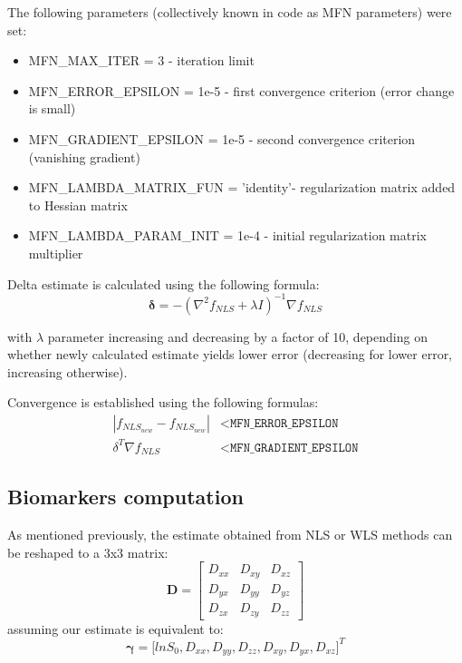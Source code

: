 The following parameters (collectively known in code as MFN parameters) were set:
\begin{itemize}
	\item 
	MFN\_MAX\_ITER = 3 - iteration limit
	
	\item
	MFN\_ERROR\_EPSILON = 1e-5 - first convergence criterion (error change is small)
	
	\item
	MFN\_GRADIENT\_EPSILON = 1e-5 - second convergence criterion (vanishing gradient)
	
	\item
	MFN\_LAMBDA\_MATRIX\_FUN = 'identity'- regularization matrix added to Hessian matrix
	
	\item 
	MFN\_LAMBDA\_PARAM\_INIT = 1e-4 - initial regularization matrix multiplier
\end{itemize}

Delta estimate is calculated using the following formula:
\begin{equation}
\boldsymbol{\delta}=-\left(\nabla^2{f_{NLS}+\lambda I}\right)^{-1}\nabla{f_{NLS}}
\label{Eq:m6_impl_3}
\end{equation}

with $\lambda$ parameter increasing and decreasing by a factor of 10, depending on whether newly calculated estimate yields lower error (decreasing for lower error, increasing otherwise).

Convergence is established using the following formulas:
\begin{equation}
\begin{aligned}
\left|f_{NLS_{new}} - f_{NLS_{new}}\right| &< \texttt{MFN\_ERROR\_EPSILON} \\
\delta^T\nabla{f_{NLS}} &< \texttt{MFN\_GRADIENT\_EPSILON}
\end{aligned}
\end{equation}

\subsection{Biomarkers computation}

As mentioned previously, the estimate obtained from NLS or WLS methods can be reshaped to a 3x3 matrix:
\begin{equation}
\boldsymbol{D}=
\begin{bmatrix}
D_{xx} & D_{xy} & D_{xz} \\
D_{yx} & D_{yy} & D_{yz} \\
D_{zx} & D_{zy} & D_{zz} 
\end{bmatrix}
\label{Eq:m6_impl_4}
\end{equation}
assuming our estimate is equivalent to:
\begin{equation}
\boldsymbol{\gamma}={\lbrack ln{S_0}, D_{xx}, D_{yy}, D_{zz}, D_{xy}, D_{yx}, D_{xz}\rbrack}^T
\label{Eq:m6_impl_5}
\end{equation}

